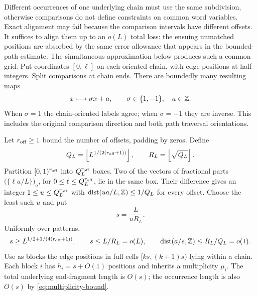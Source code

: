 Different occurrences of one underlying chain must use the same subdivision, otherwise comparisons do not define constraints on common word variables. Exact alignment may fail because the comparison intervals have different offsets. It suffices to align them up to an $o(L)$ total loss: the ensuing unmatched positions are absorbed by the same error allowance that appears in the bounded-path estimate. The simultaneous approximation below produces such a common grid.
Put coordinates $[0,\ell]$ on each oriented chain, with edge positions at half-integers. Split comparisons at chain ends. There are boundedly many resulting maps
\[
 x\longmapsto \sigma x+a,\qquad \sigma\in\{1,-1\},\quad a\in\mathbb Z.
\]
When $\sigma=1$ the chain-oriented labels agree; when $\sigma=-1$ they are inverse. This includes the original comparison direction and both path traversal orientations.

Let $r_{\rm off}\ge1$ bound the number of offsets, padding by zeros. Define
\[
 Q_L=\left\lfloor L^{1/(2(r_{\rm off}+1))}\right\rfloor,\qquad R_L=\left\lfloor \sqrt{Q_L}\right\rfloor.
\]
Partition $[0,1)^{r_{\rm off}}$ into $Q_L^{r_{\rm off}}$ boxes. Two of the vectors of fractional parts $\bigl(\{\ell a/L\}\bigr)_a$, for $0\le\ell\le Q_L^{r_{\rm off}}$, lie in the same box. Their difference gives an integer $1\le u\le Q_L^{r_{\rm off}}$ with $\operatorname{dist}(ua/L,\mathbb Z)\le1/Q_L$ for every offset. Choose the least such $u$ and put
\begin{equation}\label{eq:grid-scale}
 s=\frac{L}{uR_L}.
\end{equation}
Uniformly over patterns,
\[
 s\ge L^{1/2+1/(4(r_{\rm off}+1))},\qquad
 s\le L/R_L=o(L),\qquad
 \operatorname{dist}(a/s,\mathbb Z)\le R_L/Q_L=o(1).
\]
Use as blocks the edge positions in full cells $[ks,(k+1)s)$ lying within a chain. Each block $i$ has $h_i=s+O(1)$ positions and inherits a multiplicity $\mu_i$. The total underlying end-fragment length is $O(s)$; the occurrence length is also $O(s)$ by \eqref{eq:multiplicity-bound}.

